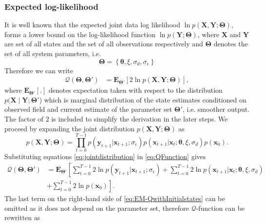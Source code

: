 \documentclass[]{article}
\begin{document}
\subsubsection{Expected log-likelihood} 
It is well known that the expected joint data log likelihood $\ln p(\mathbf X,\mathbf Y;\boldsymbol\Theta)$, forms a lower bound on the log-likelihood function $\ln p(\mathbf Y;\boldsymbol\Theta)$, where $\mathbf X$ and $\mathbf Y$ are set of all states and the set of all observations respectively and $\boldsymbol \Theta$ denotes the set of all system parameters, i.e.
\begin{equation}
	\boldsymbol\Theta = \left\lbrace \boldsymbol\theta, \xi, \sigma_d, \sigma_{\epsilon}\right\rbrace 
\end{equation}
 Therefore we can write
\begin{align}\label{eq:QFunction}
 \mathcal Q(\boldsymbol \Theta,\boldsymbol\Theta')&=\mathbf E_{\boldsymbol \Theta'}\left[2\ln p(\mathbf X,\mathbf Y;\boldsymbol \Theta)\right],
\end{align}
where $ \mathbf E_{\boldsymbol \Theta'}\left[ .\right] $ denotes expectation taken with respect to the distribution $p(\mathbf X\mid\mathbf Y;\boldsymbol \Theta'$) which is marginal distribution of the state estimates conditioned on observed field and current estimate of the parameter set $\boldsymbol\Theta'$, i.e. smoother output. The factor of $2$ is included to simplify the derivation in the later steps. We proceed by expanding the joint distribution $p(\mathbf X,\mathbf Y;\boldsymbol \Theta)$ as 
\begin{equation}\label{eq:jointdistribution}
 p(\mathbf X,\mathbf Y;\boldsymbol \Theta)=\prod_{t=0}^{T-1} p(\mathbf y_{t+1}|\mathbf x_{t+1}; \sigma_{\epsilon})p(\mathbf x_{t+1}|\mathbf x_{t};\boldsymbol \theta, \xi, \sigma_d)p(\mathbf x_0).
\end{equation}
 Substituting equations \eqref{eq:jointdistribution} in \eqref{eq:QFunction} gives
\begin{align}\label{eq:EM-QwithInitialstates}
 \mathcal Q(\boldsymbol \Theta,\boldsymbol\Theta')&=\mathbf E_{\boldsymbol\Theta'}\left[\sum_{t=0}^{T-1}2\ln p(\mathbf y_{t+1}|\mathbf x_{t+1};\sigma_{\epsilon})+\sum_{t=0}^{T-1}2\ln p(\mathbf x_{t+1}|\mathbf x_{t};\boldsymbol \theta,\xi, \sigma_d) \right.\nonumber \\
&\left.+\sum_{t=0}^{T-1}2\ln p(\mathbf x_0)\right].
\end{align}
 The last term on the right-hand side of \eqref{eq:EM-QwithInitialstates} can be omitted as it does not depend on the parameter set, therefore $\mathcal Q$-function can be rewritten as
\end{document}
